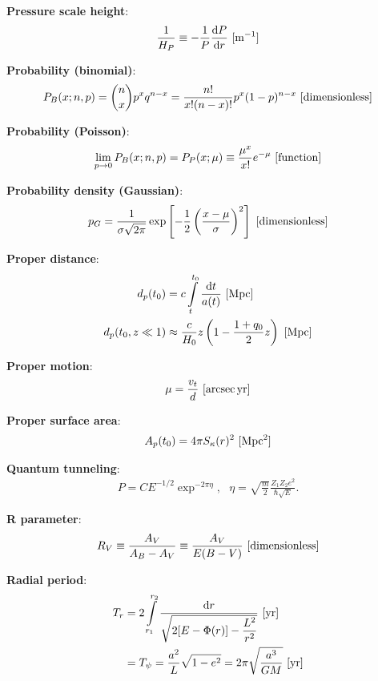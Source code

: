 \documentclass[a4paper,10pt]{article}
\begin{document}
{\noindent}\textbf{Pressure scale height}:
\begin{align*}
    \frac{1}{H_P} \equiv -\frac{1}{P}\frac{{\rm d}P}{{\rm d}r} ~ [{\rm m^{-1}}]
\end{align*}

{\noindent}\textbf{Probability (binomial)}:
\begin{align*}
    P_B(x;n,p) = \binom{n}{x}p^xq^{n-x} = \frac{n!}{x!(n-x)!}p^x(1-p)^{n-x} ~ [{\rm dimensionless}]
\end{align*}

{\noindent}\textbf{Probability (Poisson)}:
\begin{align*}
    \lim_{p\rightarrow0}P_B(x;n,p) = P_P(x;\mu) \equiv \frac{\mu^x}{x!}e^{-\mu} ~ [{\rm function}]
\end{align*}

{\noindent}\textbf{Probability density (Gaussian)}:
\begin{align*}
    p_G = \frac{1}{\sigma\sqrt{2\pi}}\exp \left[-\frac{1}{2} \left(\frac{x-\mu}{\sigma}\right)^2 \right] ~ [{\rm dimensionless}]
\end{align*}

{\noindent}\textbf{Proper distance}:
\begin{align*}
    d_p(t_0) &= c\int\limits_t^{t_0}\frac{\mathrm{d}t}{a(t)} ~ [{\rm Mpc}] \\
    d_p(t_0,z\ll1) &\approx \frac{c}{H_0}z \left(1-\frac{1+q_0}{2}z\right) ~ [{\rm Mpc}]
\end{align*}

{\noindent}\textbf{Proper motion}:
\begin{align*}
    \mu = \frac{v_t}{d} ~ [{\rm arcsec\,yr}]
\end{align*}

{\noindent}\textbf{Proper surface area}:
\begin{align*}
    A_p(t_0) = 4\pi S_\kappa(r)^2 ~ [{\rm Mpc^2}]
\end{align*}

{\noindent}\textbf{Quantum tunneling}:
\begin{align*}
    P = CE^{-1/2}\exp^{-2\pi\eta}, ~~~ \eta=\sqrt{\frac{m}{2}}\frac{Z_1Z_2e^2}{\hbar\sqrt{E}}.
\end{align*}

{\noindent}\textbf{R parameter}:
\begin{align*}
    R_V \equiv \frac{A_V}{A_B-A_V} \equiv \frac{A_V}{E(B-V)} ~ [{\rm dimensionless}]
\end{align*}

{\noindent}\textbf{Radial period}:
\begin{align*}
    T_r &= 2\int\limits_{r_1}^{r_2} \frac{{\rm d}r}{\sqrt{2[E-\Phi(r)]-\dfrac{L^2}{r^2}}} ~ [{\rm yr}] \\
    &= T_\psi = \frac{a^2}{L}\sqrt{1-e^2} = 2\pi\sqrt{\frac{a^3}{GM}} ~ [{\rm yr}]
\end{align*}
\end{document}
